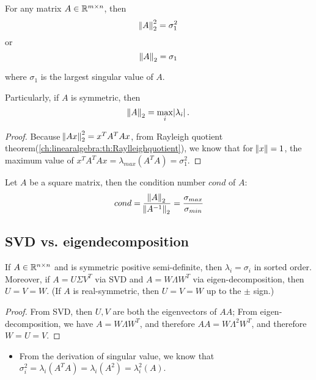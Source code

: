\begin{refsection}
\begin{theorem}\label{ch:linearalgebra:th:matrix2normsingularvalueeigenvalue}
For any matrix $A\in \mathbb{R}^{m\times n}$, then
$$\norm{A}_2^2 =  \sigma^2_1$$
or $$\norm{A}_2 =  \sigma_1$$

where $\sigma_1$ is the largest singular value of $A$.

Particularly, if $A$ is symmetric, then 
$$\norm{A}_2 = \max_{i} \abs{\lambda_i}.$$
\end{theorem}

\begin{proof}
Because $\norm{Ax}_2^2 = x^TA^TAx$, from Rayleigh quotient theorem(\autoref{ch:linearalgebra:th:Raylleighquotient}), we know that for $\norm{x}=1$, the maximum value of $x^TA^TAx = \lambda_{max}(A^TA) = \sigma_1^2$.
\end{proof}



\begin{lemma}
Let $A$ be a square matrix, then the condition number $cond$ of $A$:
$$cond = \frac{\norm{A}_2}{\norm{A^{-1}}_2} = \frac{\sigma_{max}}{\sigma_{min}}$$
\end{lemma}



\subsection{SVD  vs. eigendecomposition}



\begin{lemma}
	If $A \in \mathbb{R}^{n\times n}$ and is symmetric positive semi-definite, then $\lambda_i = \sigma_i$ in sorted order. Moreover, if $A = U\Sigma V^T$ via SVD and $A = W\Lambda W^T$ via eigen-decomposition, then $U=V=W$. (If $A$ is real-symmetric, then $U=V=W$ up to the $\pm$ sign.)
\end{lemma}
\begin{proof}
	From SVD, then $U,V$ are both the eigenvectors of $AA$; From eigen-decomposition, we have $A = W\Lambda W^T$, and therefore $AA = W\Lambda^2W^T$, and therefore $W = U = V$.
\end{proof}


\begin{itemize}
	\item From the derivation of singular value, we know that $\sigma_i^2 = \lambda_i(A^TA) = \lambda_i (A^2) = \lambda_i^2(A)$.
\end{itemize}




\end{refsection}
